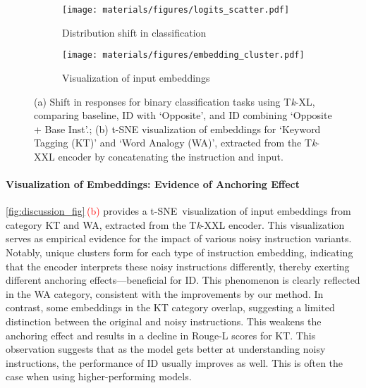 
\begin{figure}[t]
\vspace{-10pt}
    \begin{subfigure}{0.48\textwidth}
        \texttt{[image: materials/figures/logits\_scatter.pdf]}
        \caption{Distribution shift in classification}
        \label{fig7_1} 
    \end{subfigure}
    \hfill
    \begin{subfigure}{0.48\textwidth}
        \texttt{[image: materials/figures/embedding\_cluster.pdf]}
        \caption{Visualization of input embeddings}
        \label{fig7_2}
    \end{subfigure}
    \vspace{-5pt}
    \caption{(a) Shift in responses for binary classification tasks using T\textit{k}-XL, comparing baseline, ID with `Opposite', and ID combining `Opposite + Base Inst'.; (b) t-SNE visualization of embeddings for `Keyword Tagging (KT)' and `Word Analogy (WA)', extracted from the T\textit{k}-XXL encoder by concatenating the instruction and input.}
    \label{fig:discussion_fig}
    \vspace{-15pt}
\end{figure}

\vspace{-5pt}
\paragraph{Visualization of Embeddings: Evidence of Anchoring Effect}

\autoref{fig:discussion_fig}\,\textcolor{red}{(b)} provides a t-SNE\,\citep{t-SNE} visualization of input embeddings from category KT and WA, extracted from the T\textit{k}-XXL encoder. This visualization serves as empirical evidence for the impact of various noisy instruction variants. Notably, unique clusters form for each type of instruction embedding, indicating that the encoder interprets these noisy instructions differently, thereby exerting different anchoring effects—beneficial for ID. This phenomenon is clearly reflected in the WA category, consistent with the improvements by our method. In contrast, some embeddings in the KT category overlap, suggesting a limited distinction between the original and noisy instructions. This weakens the anchoring effect and results in a decline in Rouge-L scores for KT. This observation suggests that as the model gets better at understanding noisy instructions, the performance of ID usually improves as well. This is often the case when using higher-performing models.

